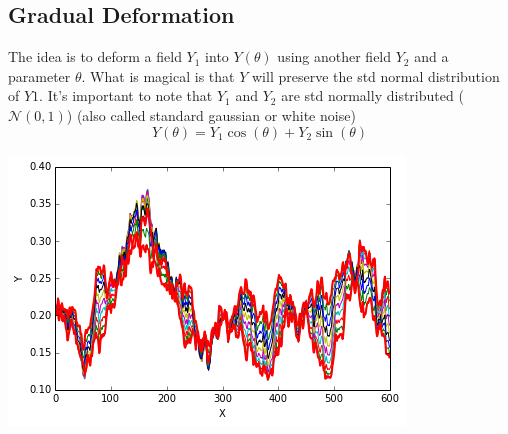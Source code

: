 \documentclass{article}
\newenvironment{Figure}
  {\par\medskip\noindent\minipage{\linewidth}}
  {\endminipage\par\medskip}
\begin{document}
\begin{multicols}{2}
\subsection{Gradual Deformation}
The idea is to deform a field $Y_1$ into $Y(\theta)$ using another field $Y_2$ and a parameter $\theta$. What is magical is that $Y$ will preserve the std normal distribution of $Y1$. It's important to note that $Y_1$ and $Y_2$ are  std normally distributed ($ \mathcal{N}(0,1)$) (also called standard gaussian or white noise)
\[Y( \theta) = Y_1 \cos ( \theta) + Y_2 \sin ( \theta)\]
\begin{Figure}
 \centering
 \includegraphics[width=\linewidth]{grad-1.png}
\end{Figure}


\end{multicols}
\end{document}

